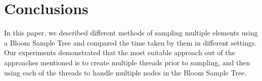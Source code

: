 \documentclass[a4paper]{article}
\begin{document}
\section{Conclusions}
In this paper, we described different methods of sampling multiple elements using a Bloom Sample Tree and compared the time taken by them in different settings. Our experiments demonstrated that the most suitable approach out of the approaches mentioned is to create multiple threads prior to sampling, and then using each of the threads to handle multiple nodes in the Bloom Sample Tree.


\end{document}
